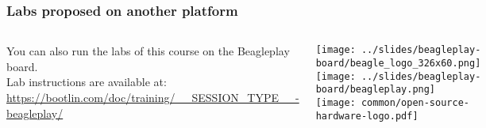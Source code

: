 \begin{frame}
\frametitle{Labs proposed on another platform}
  \begin{columns}
    You can also run the labs of this course on the Beagleplay board.\\
    \vspace{1em}
    Lab instructions are available at:\\
    {\small \url{https://bootlin.com/doc/training/__SESSION_TYPE__-beagleplay/}}
    \begin{center}
      \texttt{[image: ../slides/beagleplay-board/beagle\_logo\_326x60.png]}\\
      \texttt{[image: ../slides/beagleplay-board/beagleplay.png]}\\
      \texttt{[image: common/open-source-hardware-logo.pdf]}
    \end{center}
  \end{columns}
\end{frame}
